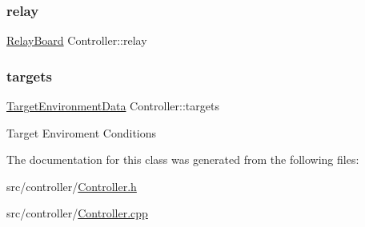 \subsubsection{\texorpdfstring{relay}{relay}}
{\footnotesize\ttfamily \hyperlink{classRelayBoard}{Relay\+Board} Controller\+::relay\hspace{0.3cm}{\ttfamily [private]}}

\mbox{\label{classController_a8f2fb8295fd3da6ebc8bdb0f25036322}} 
\subsubsection{\texorpdfstring{targets}{targets}}
{\footnotesize\ttfamily \hyperlink{structTargetEnvironmentData}{Target\+Environment\+Data} Controller\+::targets}

Target Enviroment Conditions 

The documentation for this class was generated from the following files\+:\begin{DoxyCompactItemize}
\item 
src/controller/\hyperlink{Controller_8h}{Controller.\+h}\item 
src/controller/\hyperlink{Controller_8cpp}{Controller.\+cpp}\end{DoxyCompactItemize}
